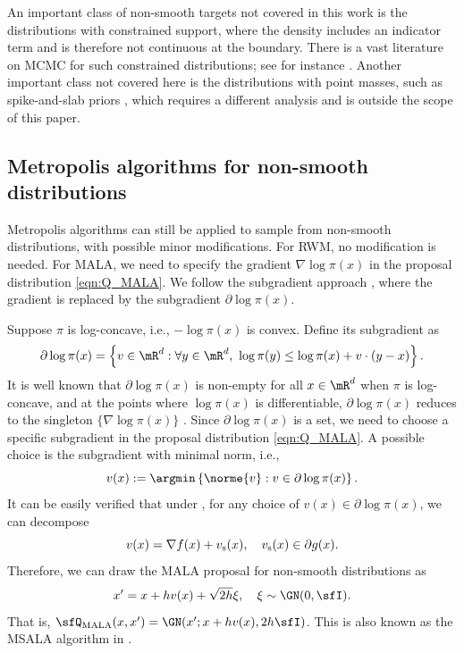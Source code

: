 \documentclass[11pt]{article}
\begin{document}
\begin{rem}
An important class of non-smooth targets not covered in this work is the distributions with constrained support, where the density includes an indicator term and is therefore not continuous at the boundary.
There is a vast literature on MCMC for such constrained distributions; see for instance \cite{MR1733749}.
%
Another important class not covered here is the distributions with point masses, such as spike-and-slab priors \citep{MR2370074}, which requires a different analysis and is outside the scope of this paper.
\end{rem}



\subsection{Metropolis algorithms for non-smooth distributions}
\label{sec:MH4NonSmth}

Metropolis algorithms can still be applied to sample from non-smooth distributions, with possible minor modifications.
%
For RWM, no modification is needed.
For MALA, we need to specify the gradient $\nabla \log \pi(x)$ in the proposal distribution \eqref{eqn:Q_MALA}.
%
We follow the subgradient approach \citep{JMLR:v20:18-173}, where the gradient is replaced by the subgradient $\partial \log \pi(x)$.



Suppose $\pi$ is log-concave, i.e., $-\log \pi(x)$ is convex.
Define its subgradient as
\begin{equation}
\label{eqn:def_subdiff}
    \partial \log \pi(x) = \left\{ v \in \mR^d : \forall y\in\mR^d,~ \log \pi(y) \le \log \pi(x) + v \cdot (y-x) \right\}.
\end{equation}
It is well known that $\partial \log \pi(x)$ is non-empty for all $x\in\mR^d$ when $\pi$ is log-concave, and at the points where $\log \pi(x)$ is differentiable, $\partial \log \pi(x)$ reduces to the singleton $\{ \nabla \log \pi(x) \}$ \citep{MR2142598}.
%
Since $\partial \log \pi(x)$ is a set, we need to choose a specific subgradient in the proposal distribution \eqref{eqn:Q_MALA}.
A possible choice is the subgradient with minimal norm, i.e.,
\begin{equation}
    v(x) := \argmin \left\{ \norme{v} : v \in \partial \log \pi(x) \right\}.
\end{equation}
It can be easily verified that under , for any choice of $v(x) \in \partial \log \pi(x)$, we can decompose
\begin{equation}
\label{eqn:v_decomp}
    v(x) = \nabla f (x) + v_{\rm s}(x), \quad v_{\rm s}(x) \in \partial g(x). 
\end{equation}
Therefore, we can draw the MALA proposal for non-smooth distributions as
\begin{equation}
    x' = x + h v(x) + \sqrt{2h} \xi, \quad \xi \sim \GN(0,\sfI).
\end{equation}
That is, $\sfQ_{\rm MALA}(x,x') = \GN(x'; x + h v(x), 2h \sfI)$. This is also known as the MSALA algorithm in \cite{ning2025metropolis}. 
\end{document}
